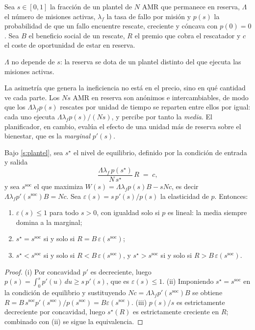 Sea $s\in[0,1]$ la fracción de un plantel de $N$ AMR que permanece en reserva,
$\Lambda$ el número de misiones activas, $\lambda_f$ la tasa de fallo por misión
y $p(s)$ la probabilidad de que un fallo encuentre rescate, creciente y cóncava
con $p(0)=0$. Sea $B$ el beneficio social de un rescate, $R$ el premio que cobra
el rescatador y $c$ el coste de oportunidad de estar en reserva.

\begin{supuesto}
\label{s:plantel}
$\Lambda$ no depende de $s$: la reserva se dota de un plantel distinto del que
ejecuta las misiones activas.
\end{supuesto}

La asimetría que genera la ineficiencia no está en el precio, sino en qué
cantidad ve cada parte. Los $Ns$ AMR en reserva son anónimos e intercambiables,
de modo que los $\Lambda\lambda_f p(s)$ rescates por unidad de tiempo se reparten
entre ellos por igual: cada uno ejecuta $\Lambda\lambda_f p(s)/(Ns)$, y percibe
por tanto la \emph{media}. El planificador, en cambio, evalúa el efecto de una
unidad más de reserva sobre el bienestar, que es la \emph{marginal} $p'(s)$.

\begin{teorema}
\label{th:subprovision}
Bajo \cref{s:plantel}, sea $s^\star$ el nivel de equilibrio, definido por la
condición de entrada y salida
\[
  \frac{\Lambda\lambda_f\,p(s^\star)}{N\,s^\star}\,R\;=\;c,
\]
y sea $s^{\mathrm{soc}}$ el que maximiza $W(s)=\Lambda\lambda_f p(s)B-sNc$, es
decir $\Lambda\lambda_f p'(s^{\mathrm{soc}})B=Nc$. Sea
$\varepsilon(s)=s\,p'(s)/p(s)$ la elasticidad de $p$. Entonces:
\begin{enumerate}[label=(\roman*),leftmargin=2.2em,topsep=0.2em,itemsep=0.15em]
  \item $\varepsilon(s)\le1$ para todo $s>0$, con igualdad solo si $p$ es lineal:
  la media siempre domina a la marginal;
  \item $s^\star=s^{\mathrm{soc}}$ si y solo si $R=B\,\varepsilon(s^{\mathrm{soc}})$;
  \item $s^\star<s^{\mathrm{soc}}$ si y solo si $R<B\,\varepsilon(s^{\mathrm{soc}})$,
  y $s^\star>s^{\mathrm{soc}}$ si y solo si $R>B\,\varepsilon(s^{\mathrm{soc}})$.
\end{enumerate}
\end{teorema}

\begin{proof}
(i) Por concavidad $p'$ es decreciente, luego
$p(s)=\int_0^s p'(u)\,du\ge s\,p'(s)$, que es $\varepsilon(s)\le1$.
(ii) Imponiendo $s^\star=s^{\mathrm{soc}}$ en la condición de equilibrio y
sustituyendo $Nc=\Lambda\lambda_f p'(s^{\mathrm{soc}})B$ se obtiene
$R=B\,s^{\mathrm{soc}}p'(s^{\mathrm{soc}})/p(s^{\mathrm{soc}})=B\varepsilon(s^{\mathrm{soc}})$.
(iii) $p(s)/s$ es estrictamente decreciente por concavidad, luego $s^\star(R)$ es
estrictamente creciente en $R$; combinado con (ii) se sigue la equivalencia.
\end{proof}

